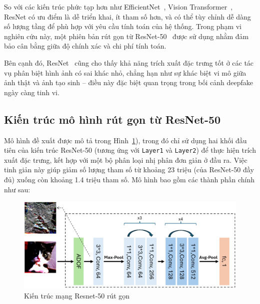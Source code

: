 So với các kiến trúc phức tạp hơn như EfficientNet~\cite{zhong2024patchcraftexploringtexturepatch}, Vision Transformer~\cite{dosovitskiy2020image}, ResNet có ưu điểm là dễ triển khai, ít tham số hơn, và có thể tùy chỉnh dễ dàng số lượng tầng để phù hợp với yêu cầu tính toán của hệ thống. Trong phạm vi nghiên cứu này, một phiên bản rút gọn từ ResNet-50~\cite{He2015DeepRL} được sử dụng nhằm đảm bảo cân bằng giữa độ chính xác và chi phí tính toán.

Bên cạnh đó, ResNet~\cite{He2015DeepRL} cũng cho thấy khả năng trích xuất đặc trưng tốt ở các tác vụ phân biệt hình ảnh có sai khác nhỏ, chẳng hạn như sự khác biệt vi mô giữa ảnh thật và ảnh tạo sinh – điều này đặc biệt quan trọng trong bối cảnh \gls{deepfake} ngày càng tinh vi.

\subsection{Kiến trúc mô hình rút gọn từ ResNet-50}
\label{sec:kien_truc_mo_hinh_rut_gon_tu_resnet_50}
Mô hình đề xuất được mô tả trong Hình~\ref{fig:figure_model_architecture}), trong đó chỉ sử dụng hai khối đầu tiên của kiến trúc ResNet-50 (tương ứng với \texttt{Layer1} và \texttt{Layer2}) để thực hiện trích xuất đặc trưng, kết hợp với một bộ phân loại nhị phân đơn giản ở đầu ra. Việc tinh giản này giúp giảm số lượng tham số từ khoảng 23 triệu (của ResNet-50 đầy đủ) xuống còn khoảng 1.4 triệu tham số. Mô hình bao gồm các thành phần chính như sau:
%
\begin{figure}[h!]
	\centering
	\includegraphics[width=1.0\linewidth]{Images/figure_model_architecture.png}
	\begin{minipage}{1.0\linewidth}
		\vspace{5mm}
		\caption{Kiến trúc mạng Resnet-50 rút gọn}
		\label{fig:figure_model_architecture}
	\end{minipage}
\end{figure}
%
%

